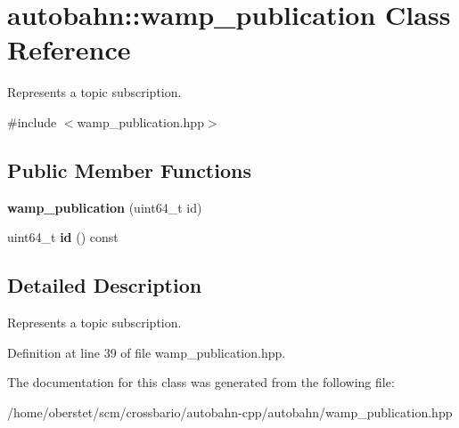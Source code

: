 \hypertarget{classautobahn_1_1wamp__publication}{}\section{autobahn\+:\+:wamp\+\_\+publication Class Reference}
\label{classautobahn_1_1wamp__publication}


Represents a topic subscription.  




{\ttfamily \#include $<$wamp\+\_\+publication.\+hpp$>$}

\subsection*{Public Member Functions}
\begin{DoxyCompactItemize}
\item 
{\bfseries wamp\+\_\+publication} (uint64\+\_\+t id)\hypertarget{classautobahn_1_1wamp__publication_a18dba6991f28540c2e784ee77f9fc5eb}{}\label{classautobahn_1_1wamp__publication_a18dba6991f28540c2e784ee77f9fc5eb}

\item 
uint64\+\_\+t {\bfseries id} () const \hypertarget{classautobahn_1_1wamp__publication_a68cdb9c236d8f1293576d95be055d6d4}{}\label{classautobahn_1_1wamp__publication_a68cdb9c236d8f1293576d95be055d6d4}

\end{DoxyCompactItemize}


\subsection{Detailed Description}
Represents a topic subscription. 

Definition at line 39 of file wamp\+\_\+publication.\+hpp.



The documentation for this class was generated from the following file\+:\begin{DoxyCompactItemize}
\item 
/home/oberstet/scm/crossbario/autobahn-\/cpp/autobahn/wamp\+\_\+publication.\+hpp\end{DoxyCompactItemize}

